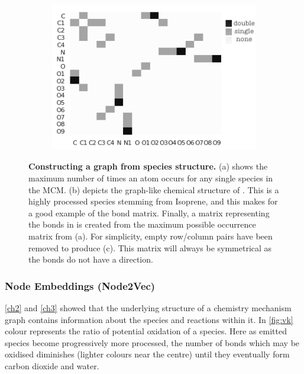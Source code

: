 \begin{figure}[H]
\begin{subfigure}[b]{0.325\textwidth}
         \includegraphics[width=\textwidth,height=.8\textwidth]{4fig/INB1NBCO3_adj.png}
          \caption{}
         \label{fig:adjmol}
     \end{subfigure}

        \caption{ \textbf{Constructing a graph from species structure.}
        (a) shows the maximum number of times an atom occurs for any single species in the MCM. (b) depicts the graph-like chemical structure of . This is a highly processed species stemming from Isoprene, and this makes for a good example of the bond matrix. Finally, a matrix representing the bonds in  is created from the maximum possible occurrence matrix from (a). For simplicity, empty row/column pairs have been removed to produce (c). This matrix will always be symmetrical as the bonds do not have a direction.}
        \label{fig:bondmat}
\end{figure}


\subsubsection{Node Embeddings (Node2Vec)}\label{sec:n2vec}
\autoref{ch2} and \autoref{ch3} showed that the underlying structure of a chemistry mechanism graph contains information about the species and reactions within it. In \autoref{fig:vk} colour represents the ratio of potential oxidation of a species. Here as emitted species become progressively more processed, the number of bonds which may be oxidised diminishes (lighter colours near the centre) until they eventually form carbon dioxide and water.


